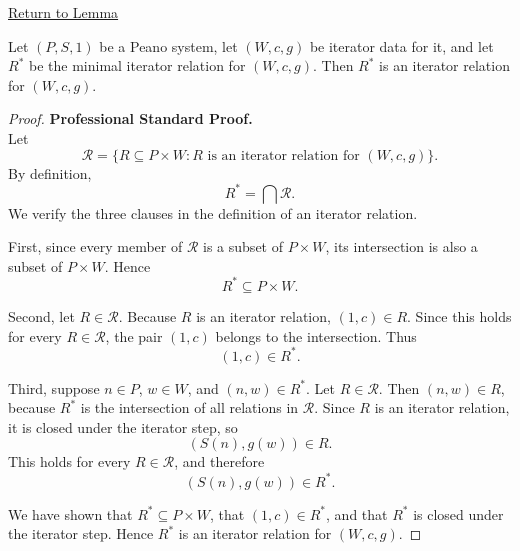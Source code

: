 \newpage
{}
\label{prf:iterator-relation-consistency}

\begin{remark*}[Return]
\hyperref[lem:iterator-relation-consistency]{Return to Lemma}
\end{remark*}


\begin{theorem*}
Let $(P,S,1)$ be a Peano system, let $(W,c,g)$ be iterator data for it, and let
$R^*$ be the minimal iterator relation for $(W,c,g)$. Then $R^*$ is an
iterator relation for $(W,c,g)$.
\end{theorem*}

\begin{proof}
\textbf{Professional Standard Proof.}~\\
Let
\[
\mathcal R=
\{R\subseteq P\times W : R \text{ is an iterator relation for } (W,c,g)\}.
\]
By definition,
\[
R^*=\bigcap \mathcal R.
\]
We verify the three clauses in the definition of an iterator relation.

First, since every member of $\mathcal R$ is a subset of $P\times W$, its
intersection is also a subset of $P\times W$. Hence
\[
R^*\subseteq P\times W.
\]

Second, let $R\in\mathcal R$. Because $R$ is an iterator relation,
$(1,c)\in R$. Since this holds for every $R\in\mathcal R$, the pair $(1,c)$
belongs to the intersection. Thus
\[
(1,c)\in R^*.
\]

Third, suppose $n\in P$, $w\in W$, and $(n,w)\in R^*$. Let $R\in\mathcal R$.
Then $(n,w)\in R$, because $R^*$ is the intersection of all relations in
\(\mathcal R\). Since $R$ is an iterator relation, it is closed under the
iterator step, so
\[
(S(n),g(w))\in R.
\]
This holds for every $R\in\mathcal R$, and therefore
\[
(S(n),g(w))\in R^*.
\]

We have shown that $R^*\subseteq P\times W$, that $(1,c)\in R^*$, and that
$R^*$ is closed under the iterator step. Hence $R^*$ is an iterator relation
for $(W,c,g)$.
\end{proof}

